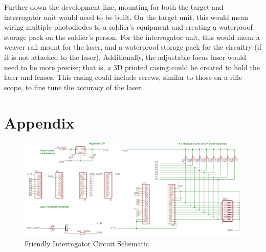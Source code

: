 \documentclass[letterpaper,10pt]{article}
\begin{document}
\begin{spacing}{1.15}
Further down the development line, mounting for both the target and interrogator unit would need to be built. On the target unit, this would mean wiring multiple photodiodes to a soldier's equipment and creating a waterproof storage pack on the soldier's person. For the interrogator unit, this would mean a weaver rail mount for the laser, and a waterproof storage pack for the circuitry (if it is not attached to the laser). Additionally, the adjustable focus laser would need to be more precise; that is, a 3D printed casing could be created to hold the laser and lenses. This casing could include screws, similar to those on a rifle scope, to fine tune the accuracy of the laser. 

\clearpage

\clearpage
\section*{Appendix}

\begin{figure} [H]
	\centering
	\includegraphics[scale=0.37]{friendly_interrogator_circuit.png}
	\caption{Friendly Interrogator Circuit Schematic \label{fig:interrogator-schematic}}
\end{figure}


\end{spacing}
\end{document}
